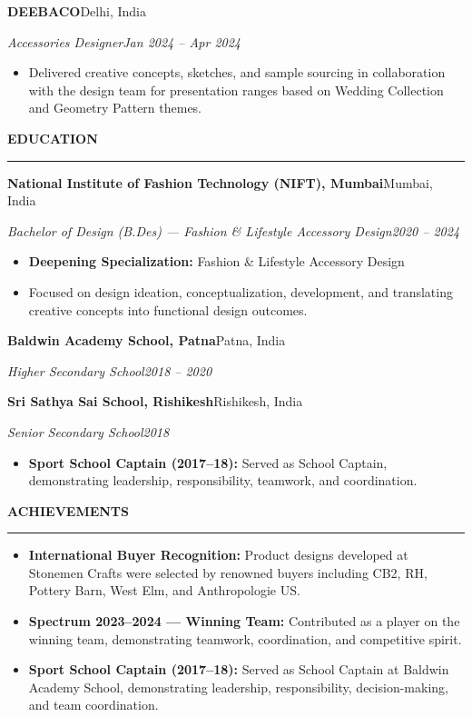 \documentclass[a4paper]{article}
\newlength{\mainwidth}\setlength{\mainwidth}{14cm}
\newlength{\mainpad}\setlength{\mainpad}{0.6cm}
\newcommand{\mainsec}[1]{%
  \vspace{9pt}%
  {\fontsize{10.5}{12}\selectfont\bfseries\color{accent}%
   \MakeUppercase{#1}}\par\nobreak
  \vspace{1.5pt}%
  {\color{rulecolor}\rule{\linewidth}{0.3pt}}\par\nobreak
  \vspace{4pt}%
}
\newcommand{\entry}[4]{%
  \par\vspace{3pt}%
  {\small\textbf{#1}\hfill#2}\par\nobreak
  {\small\itshape\color{subtext}#3\hfill#4}\par\nobreak
  \vspace{1pt}%
}
\newcommand{\blt}[1]{\item\small #1}
\begin{document}
\begin{minipage}[t][\paperheight]{\mainwidth}
\begin{minipage}[t]{\dimexpr\mainwidth-2\mainpad\relax}
\entry{DEEBACO}{Delhi, India}
      {Accessories Designer}{Jan 2024 -- Apr 2024}
\begin{itemize}[leftmargin=0.14in,itemsep=0pt,topsep=1pt,parsep=0pt]
  \blt{Delivered creative concepts, sketches, and sample sourcing in
    collaboration with the design team for presentation ranges based on
    Wedding Collection and Geometry Pattern themes.}
\end{itemize}

\mainsec{Education}

\entry{National Institute of Fashion Technology (NIFT), Mumbai}
      {Mumbai, India}
      {Bachelor of Design (B.Des) --- Fashion \& Lifestyle Accessory Design}
      {2020 -- 2024}

\begin{itemize}[leftmargin=0.14in,itemsep=1pt,topsep=1pt,parsep=0pt]
  \blt{\textbf{Deepening Specialization:} Fashion \& Lifestyle Accessory Design}
  \blt{Focused on design ideation, conceptualization, development, and translating creative concepts into functional design outcomes.}
\end{itemize}

\vspace{3pt}

\entry{Baldwin Academy School, Patna}
      {Patna, India}
      {Higher Secondary School}
      {2018 -- 2020}

\vspace{3pt}

\entry{Sri Sathya Sai School, Rishikesh}
      {Rishikesh, India}
      {Senior Secondary School}
      {2018}

\begin{itemize}[leftmargin=0.14in,itemsep=1pt,topsep=1pt,parsep=0pt]
  \blt{\textbf{Sport School Captain (2017--18):} Served as School Captain, demonstrating leadership, responsibility, teamwork, and coordination.}
\end{itemize}


\mainsec{Achievements}

\begin{itemize}[leftmargin=0.14in,itemsep=2pt,topsep=1pt,parsep=0pt]

  \blt{\textbf{International Buyer Recognition:} Product designs developed
  at Stonemen Crafts were selected by renowned buyers including CB2, RH,
  Pottery Barn, West Elm, and Anthropologie US.}

  \blt{\textbf{Spectrum 2023--2024 --- Winning Team:} Contributed as a player on the winning team, demonstrating teamwork, coordination, and competitive spirit.}

  \blt{\textbf{Sport School Captain (2017--18):} Served as School Captain at Baldwin Academy School, demonstrating leadership, responsibility, decision-making, and team coordination.}

\end{itemize}

\end{minipage}%
\end{minipage}
\end{document}
